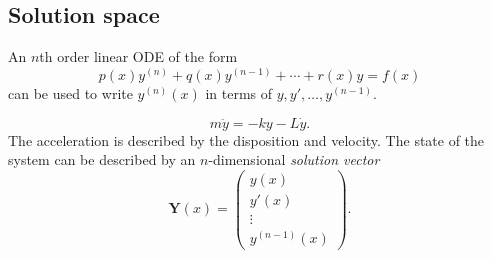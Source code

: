 \documentclass[a4paper]{article}
\begin{document}
    \subsection{Solution space}
    An $n$th order linear ODE of the form
    \[p(x)y^{(n)}+q(x)y^{(n-1)}+\cdots+r(x)y=f(x)\]
    can be used to write $y^{(n)}(x)$ in terms of $ y,y',\dots, y^{(n-1)} $.
    \begin{example}
        \[m \ddot{y}=-ky-L \dot{y}.\]
        The acceleration is described by the disposition and velocity. The state of the system can be described by an $n$-dimensional \textit{solution vector}
        \begin{equation}\label{eq:12.3}
            \mathbf{Y}(x)=\begin{pmatrix}
                y(x)\\y'(x)\\\vdots\\y^{(n-1)}(x)
            \end{pmatrix}.
        \end{equation}
    \end{example}
\end{document}
